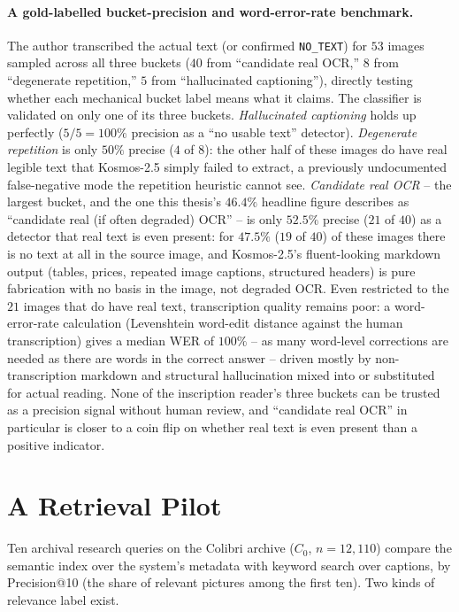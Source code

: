 \documentclass[12pt,a4paper]{report}
\begin{document}
\paragraph{A gold-labelled bucket-precision and word-error-rate benchmark.} The author transcribed the actual text (or confirmed \texttt{NO\_TEXT}) for $53$ images sampled across all three buckets ($40$ from ``candidate real OCR,'' $8$ from ``degenerate repetition,'' $5$ from ``hallucinated captioning''), directly testing whether each mechanical bucket label means what it claims. The classifier is validated on only one of its three buckets. \textit{Hallucinated captioning} holds up perfectly ($5/5=100\%$ precision as a ``no usable text'' detector). \textit{Degenerate repetition} is only $50\%$ precise ($4$ of $8$): the other half of these images do have real legible text that Kosmos-2.5 simply failed to extract, a previously undocumented false-negative mode the repetition heuristic cannot see. \textit{Candidate real OCR} -- the largest bucket, and the one this thesis's $46.4\%$ headline figure describes as ``candidate real (if often degraded) OCR'' -- is only $52.5\%$ precise ($21$ of $40$) as a detector that real text is even present: for $47.5\%$ ($19$ of $40$) of these images there is no text at all in the source image, and Kosmos-2.5's fluent-looking markdown output (tables, prices, repeated image captions, structured headers) is pure fabrication with no basis in the image, not degraded OCR. Even restricted to the $21$ images that do have real text, transcription quality remains poor: a word-error-rate calculation (Levenshtein word-edit distance against the human transcription) gives a median WER of $100\%$ -- as many word-level corrections are needed as there are words in the correct answer -- driven mostly by non-transcription markdown and structural hallucination mixed into or substituted for actual reading. None of the inscription reader's three buckets can be trusted as a precision signal without human review, and ``candidate real OCR'' in particular is closer to a coin flip on whether real text is even present than a positive indicator.

\section{A Retrieval Pilot}
\label{sec:retrieval_benchmark}
Ten archival research queries on the Colibri archive ($C_0$, $n=12{,}110$) compare the semantic index over the system's metadata with keyword search over captions, by Precision@10 (the share of relevant pictures among the first ten). Two kinds of relevance label exist.
\end{document}
